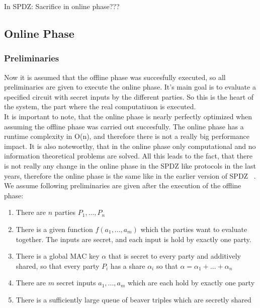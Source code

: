 \documentclass[english,runningheads,a4paper]{llncs}[2018/03/10]
\begin{document}
In SPDZ: Sacrifice in online phase???





\subsection{Online Phase}

\subsubsection{Preliminaries}


Now it is assumed that the offline phase was succesfully executed, so all preliminaries are given to execute the online phase. It's main goal is to evaluate a specified circuit with secret inputs by the different parties. So this is the heart of the system, the part where the real computatiuon is executed. \\
It is important to note, that the online phase is nearly perfectly optimized when assuming the offline phase was carried out succesfully. The online phase has a runtime complexity in O(n), and therefore there is not a really big performance impact. It is also noteworthy, that in the online phase only computational and no information theoretical problems are solved. All this leads to the fact, that there is not really any change in the online phase in the SPDZ like protocols in the last years, therefore the online phase is the same like in the earlier version of SPDZ  ~\cite{cryptoeprint:2011:535}.\\


We assume following preliminaries are given after the execution of the offline phase:\\
\begin{enumerate}
\item There are \(n\) parties \(P_1,...,P_n\)
\item There is a given function \(f(a_1,...,a_m)\) which the parties want to evaluate together. The inputs are secret, and each input is hold by exactly one party.
\item There is a global MAC key \( \alpha\) that is secret to every party and additively shared, so that every party \( P_i\) has a share  \( \alpha_i\) so that  \( \alpha=\alpha_1+...+\alpha_n\)
\item There are $m$ secret inputs $a_1,...,a_m$ which are each hold by exactly one party
\item There is a sufficiently large queue of beaver triples which are secretly shared
\end{enumerate}
\end{document}
